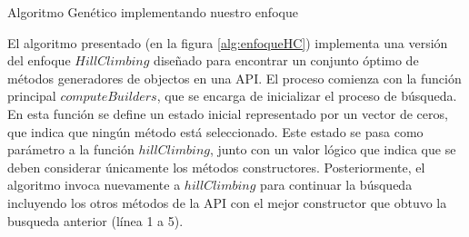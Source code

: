 
\begin{algorithm}[H]
    \caption{Algoritmo Genético implementando nuestro enfoque}
    \label{alg:enfoqueHC}

    \BlankLine

    \BlankLine

    \BlankLine



\end{algorithm}



El algoritmo presentado (en la figura \ref{alg:enfoqueHC}) implementa una versión del enfoque $Hill Climbing$ 
diseñado para encontrar un conjunto óptimo de métodos generadores de objectos en una API. 
El proceso comienza con la función principal $computeBuilders$, que se encarga de inicializar el proceso de búsqueda. 
En esta función se define un estado inicial representado por un vector de ceros, 
que indica que ningún método está seleccionado. Este estado se pasa como parámetro a la función $hillClimbing$, 
junto con un valor lógico que indica que se deben considerar únicamente los métodos constructores. 
Posteriormente, el algoritmo invoca nuevamente a $hillClimbing$ para continuar la búsqueda incluyendo los otros métodos de la API con el mejor constructor que obtuvo
la busqueda anterior (línea 1 a 5).

